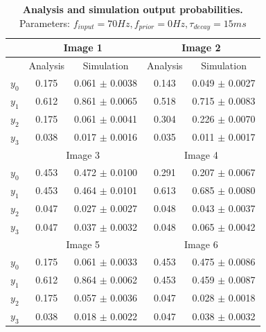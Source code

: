 \begin{table}[]
\label{tab:1D_70_0_15}
\small
\tabcolsep=0.11cm
\begin{tabular}{|c|cc|cc|}
\hline
                       & \multicolumn{2}{c|}{Image 1}                       & \multicolumn{2}{c|}{Image 2}                       \\ \hline
                       & \multicolumn{1}{c|}{Analysis} & Simulation         & \multicolumn{1}{c|}{Analysis} & Simulation         \\ \hline
$y_0$                  & \multicolumn{1}{c|}{0.175}    & 0.061 $\pm$ 0.0038 & \multicolumn{1}{c|}{0.143}    & 0.049 $\pm$ 0.0027 \\ \hline
$y_1$                  & \multicolumn{1}{c|}{0.612}    & 0.861 $\pm$ 0.0065 & \multicolumn{1}{c|}{0.518}    & 0.715 $\pm$ 0.0083 \\ \hline
$y_2$                  & \multicolumn{1}{c|}{0.175}    & 0.061 $\pm$ 0.0041 & \multicolumn{1}{c|}{0.304}    & 0.226 $\pm$ 0.0070 \\ \hline
$y_3$                  & \multicolumn{1}{c|}{0.038}    & 0.017 $\pm$ 0.0016 & \multicolumn{1}{c|}{0.035}    & 0.011 $\pm$ 0.0017 \\ \hline
                       & \multicolumn{2}{c|}{Image 3}                       & \multicolumn{2}{c|}{Image 4}                       \\ \hline
$y_0$                  & \multicolumn{1}{c|}{0.453}    & 0.472 $\pm$ 0.0100 & \multicolumn{1}{c|}{0.291}    & 0.207 $\pm$ 0.0067 \\ \hline
$y_1$                  & \multicolumn{1}{c|}{0.453}    & 0.464 $\pm$ 0.0101 & \multicolumn{1}{c|}{0.613}    & 0.685 $\pm$ 0.0080 \\ \hline
$y_2$                  & \multicolumn{1}{c|}{0.047}    & 0.027 $\pm$ 0.0027 & \multicolumn{1}{c|}{0.048}    & 0.043 $\pm$ 0.0037 \\ \hline
$y_3$                  & \multicolumn{1}{c|}{0.047}    & 0.037 $\pm$ 0.0032 & \multicolumn{1}{c|}{0.048}    & 0.065 $\pm$ 0.0042 \\ \hline
						& \multicolumn{2}{c|}{Image 5}                       & \multicolumn{2}{c|}{Image 6}                       \\ \hline
$y_0$                  & \multicolumn{1}{c|}{0.175}    & 0.061 $\pm$ 0.0033 & \multicolumn{1}{c|}{0.453}    & 0.475 $\pm$ 0.0086 \\ \hline
$y_1$                  & \multicolumn{1}{c|}{0.612}    & 0.864 $\pm$ 0.0062 & \multicolumn{1}{c|}{0.453}    & 0.459 $\pm$ 0.0087 \\ \hline
$y_2$                  & \multicolumn{1}{c|}{0.175}    & 0.057 $\pm$ 0.0036 & \multicolumn{1}{c|}{0.047}    & 0.028 $\pm$ 0.0018 \\ \hline
$y_3$                  & \multicolumn{1}{c|}{0.038}    & 0.018 $\pm$ 0.0022 & \multicolumn{1}{c|}{0.047}    & 0.038 $\pm$ 0.0032 \\ \hline
\end{tabular}
\caption{\textbf{Analysis and simulation output probabilities. } Parameters: $f_{input} = 70 Hz, f_{prior} = 0 Hz, \tau_{decay} = 15 ms$}
\end{table}

